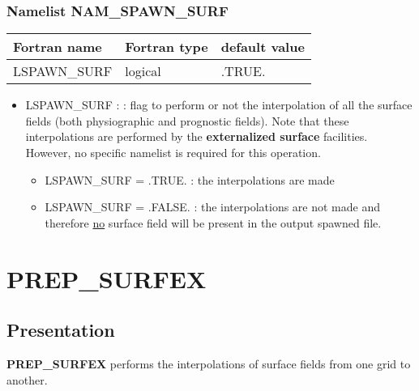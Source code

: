 \subsection{Namelist NAM\_SPAWN\_SURF}
\begin{center}
\begin{tabular} {|l|l|l|}
\hline
Fortran name & Fortran type & default value\\
\hline
\hline
LSPAWN\_SURF & logical   & .TRUE.   \\
\hline
\end{tabular}
\end{center}
\begin{itemize}
\item LSPAWN\_SURF :
 : 
flag to  perform or not the interpolation of all the surface fields (both physiographic and prognostic fields). Note that these interpolations are performed by the {\bf externalized surface} facilities. However, no specific namelist is required for this operation.
\begin{itemize}
\item LSPAWN\_SURF = .TRUE. : the interpolations are made
\item LSPAWN\_SURF = .FALSE. : the interpolations are not made and therefore \underline{no} surface field will be present in the output spawned file.
\end{itemize}
\end{itemize}
\chapter{{\bf PREP\_SURFEX}}
\section{Presentation}
{\bf PREP\_SURFEX} performs the interpolations of surface fields from one
grid to another.
\\

